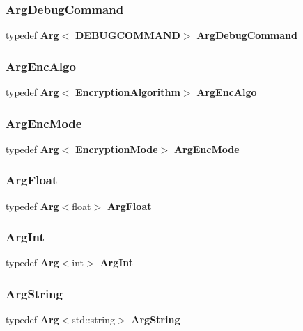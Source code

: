 \subsubsection{Arg\+Debug\+Command}
{\footnotesize\ttfamily typedef \textbf{ Arg}$<$\textbf{ D\+E\+B\+U\+G\+C\+O\+M\+M\+A\+ND}$>$ \textbf{ Arg\+Debug\+Command}}

\mbox{\label{Arg_8h_a0b488b35f66abb669211f065b8886dce}} 
\subsubsection{Arg\+Enc\+Algo}
{\footnotesize\ttfamily typedef \textbf{ Arg}$<$\textbf{ Encryption\+Algorithm}$>$ \textbf{ Arg\+Enc\+Algo}}

\mbox{\label{Arg_8h_a170e3ece558a95fe792473e932e979cc}} 
\subsubsection{Arg\+Enc\+Mode}
{\footnotesize\ttfamily typedef \textbf{ Arg}$<$\textbf{ Encryption\+Mode}$>$ \textbf{ Arg\+Enc\+Mode}}

\mbox{\label{Arg_8h_ab6e1bfda37da13fe170e0500116b3e25}} 
\subsubsection{Arg\+Float}
{\footnotesize\ttfamily typedef \textbf{ Arg}$<$float$>$ \textbf{ Arg\+Float}}

\mbox{\label{Arg_8h_a7361eb0268b64a04752f2484eef3dc7f}} 
\subsubsection{Arg\+Int}
{\footnotesize\ttfamily typedef \textbf{ Arg}$<$int$>$ \textbf{ Arg\+Int}}

\mbox{\label{Arg_8h_a32a03370bc3f9ba661ae31047c075183}} 
\subsubsection{Arg\+String}
{\footnotesize\ttfamily typedef \textbf{ Arg}$<$std\+::string$>$ \textbf{ Arg\+String}}

